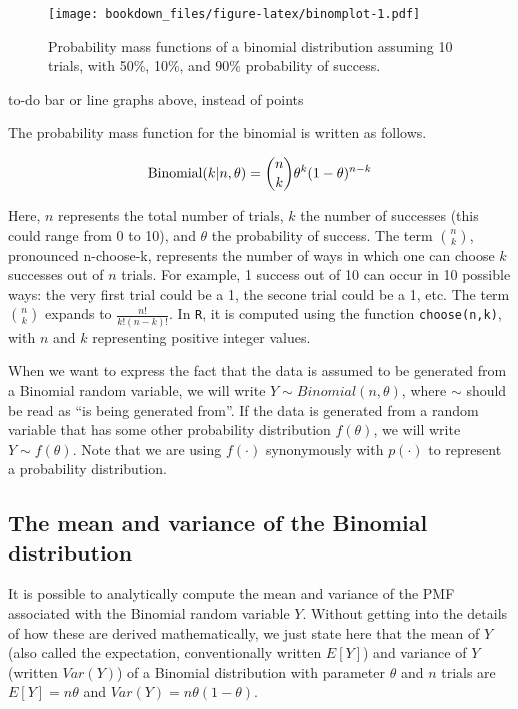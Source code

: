 \documentclass[12pt,]{krantz}
\makeatletter
\newenvironment{kframe}{%
\medskip{}
\setlength{\fboxsep}{.8em}
 \def\at@end@of@kframe{}%
 \ifinner\ifhmode%
  \def\at@end@of@kframe{\end{minipage}}%
  \begin{minipage}{\columnwidth}%
 \fi\fi%
 \def\FrameCommand##1{\hskip\@totalleftmargin \hskip-\fboxsep
 \colorbox{shadecolor}{##1}\hskip-\fboxsep
     \hskip-\linewidth \hskip-\@totalleftmargin \hskip\columnwidth}%
 \MakeFramed {\advance\hsize-\width
   \@totalleftmargin\z@ \linewidth\hsize
   \@setminipage}}%
 {\par\unskip\endMakeFramed%
 \at@end@of@kframe}
\newenvironment{rmdblock}[1]
  {
  \begin{itemize}
  \renewcommand{\labelitemi}{
    \raisebox{-.7\height}[0pt][0pt]{
      {\setkeys{Gin}{width=3em,keepaspectratio}\texttt{[image: images/\#1]}}
    }
  }
  \setlength{\fboxsep}{1em}
  \begin{kframe}
  \item
  }
  {
  \end{kframe}
  \end{itemize}
  }
\newenvironment{rmdnote}
  {\begin{rmdblock}{note}}
  {\end{rmdblock}}
\theoremstyle{definition}
\theoremstyle{definition}
\theoremstyle{definition}
\theoremstyle{remark}
\makeatother
\begin{document}
\begin{figure}
\centering
\texttt{[image: bookdown\_files/figure-latex/binomplot-1.pdf]}
\caption{\label{fig:binomplot}Probability mass functions of a binomial distribution assuming 10 trials, with 50\%, 10\%, and 90\% probability of success.}
\end{figure}

\begin{rmdnote}
to-do bar or line graphs above, instead of points
\end{rmdnote}

The probability mass function for the binomial is written as follows.

\begin{equation}
\hbox{Binomial}(k|n,\theta) = 
\binom{n}{k} \theta^{k} (1-\theta)^{n-k}
\end{equation}

Here, \(n\) represents the total number of trials, \(k\) the number of successes (this could range from 0 to 10), and \(\theta\) the probability of success. The term \(\binom{n}{k}\), pronounced n-choose-k, represents the number of ways in which one can choose \(k\) successes out of \(n\) trials. For example, 1 success out of 10 can occur in 10 possible ways: the very first trial could be a 1, the secone trial could be a 1, etc.
The term \(\binom{n}{k}\) expands to \(\frac{n!}{k!(n-k)!}\). In \texttt{R}, it is computed using the function \texttt{choose(n,k)}, with \(n\) and \(k\) representing positive integer values.

When we want to express the fact that the data is assumed to be generated from a Binomial random variable, we will write \(Y \sim Binomial(n,\theta)\), where \(\sim\) should be read as ``is being generated from''. If the data is generated from a random variable that has some other probability distribution \(f(\theta)\), we will write \(Y\sim f(\theta)\). Note that we are using \(f(\cdot)\) synonymously with \(p(\cdot)\) to represent a probability distribution.

\hypertarget{the-mean-and-variance-of-the-binomial-distribution}{%
\subsection{The mean and variance of the Binomial distribution}\label{the-mean-and-variance-of-the-binomial-distribution}}

It is possible to analytically compute the mean and variance of the PMF associated with the Binomial random variable \(Y\). Without getting into the details of how these are derived mathematically, we just state here that the mean of \(Y\) (also called the expectation, conventionally written \(E[Y]\)) and variance of \(Y\) (written \(Var(Y)\)) of a Binomial distribution with parameter \(\theta\) and \(n\) trials are \(E[Y] = n\theta\) and \(Var(Y) = n\theta (1-\theta)\).
\end{document}
